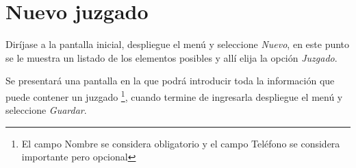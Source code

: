 \section{Nuevo juzgado}
\label{sec:nuevoJuzgado}
Dir\'ijase a la pantalla inicial, despliegue el men\'u \blackberry y seleccione
\emph{Nuevo}, en este punto se le muestra un listado de los elementos posibles y
all\'i elija la opci\'on \emph{Juzgado}.

Se presentar\'a una pantalla en la que podr\'a introducir toda la informaci\'on
que puede contener un juzgado
\footnote{El campo Nombre se considera obligatorio y el campo Tel\'efono se
considera importante pero opcional},
cuando termine de ingresarla despliegue el men\'u \blackberry y seleccione
\emph{Guardar}.